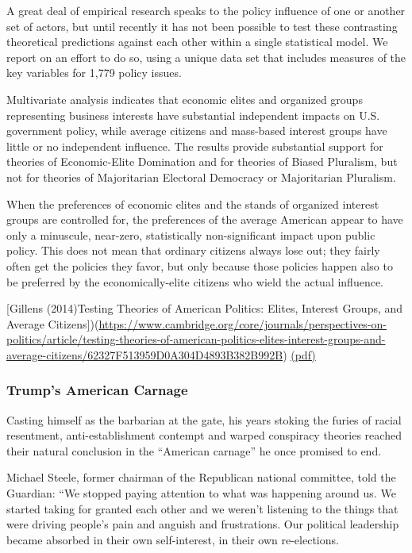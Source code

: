 \documentclass[
]{book}
\begin{document}
A great deal of empirical research speaks to the policy influence of one or another set of actors, but until recently it has not been possible to test these contrasting theoretical predictions against each other within a single statistical model. We report on an effort to do so, using a unique data set that includes measures of the key variables for 1,779 policy issues.

Multivariate analysis indicates that economic elites and organized groups representing business interests have substantial independent impacts on U.S. government policy, while average citizens and mass-based interest groups have little or no independent influence. The results provide substantial support for theories of Economic-Elite Domination and for theories of Biased Pluralism, but not for theories of Majoritarian Electoral Democracy or Majoritarian Pluralism.

When the preferences of economic elites and the stands of organized interest groups are controlled for, the preferences of the average American appear to have only a minuscule, near-zero, statistically non-significant impact upon public policy.
This does not mean that ordinary citizens always lose out; they fairly often get the policies they favor, but only because those policies happen also to be preferred by the economically-elite citizens who wield the actual influence.

{[}Gillens (2014)Testing Theories of American Politics: Elites, Interest Groups, and Average Citizens{]})(\url{https://www.cambridge.org/core/journals/perspectives-on-politics/article/testing-theories-of-american-politics-elites-interest-groups-and-average-citizens/62327F513959D0A304D4893B382B992B})
\href{pdf/Gillens_2014_Elites_interest_groups_and_average_citizens.pdf}{(pdf)}

\hypertarget{trumps-american-carnage}{%
\subsubsection{Trump's American Carnage}\label{trumps-american-carnage}}

Casting himself as the barbarian at the gate, his years stoking the furies of racial resentment, anti-establishment contempt and warped conspiracy theories reached their natural conclusion in the ``American carnage'' he once promised to end.

Michael Steele, former chairman of the Republican national committee, told the Guardian: ``We stopped paying attention to what was happening around us. We started taking for granted each other and we weren't listening to the things that were driving people's pain and anguish and frustrations. Our political leadership became absorbed in their own self-interest, in their own re-elections.
\end{document}
